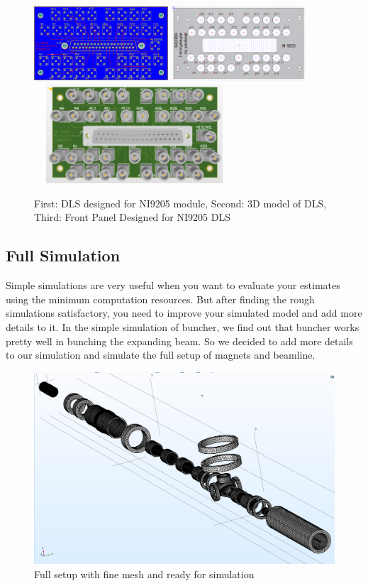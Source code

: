 \documentclass[12pt,a4paper]{article}
\begin{document}
\begin{figure}[h]
\centering
\includegraphics[width=50mm, height=28mm]{ni9205_pcb}
\includegraphics[width=50mm,
height=28mm]{ni9205panel}
\includegraphics[width=75mm,
height=37mm]{ni9205_3d}
\caption{First: DLS designed for NI9205 module, Second: 3D model of DLS, Third: Front Panel Designed for NI9205 DLS}
\label{NI}
\end{figure}


\subsection{Full Simulation}
\label{clus}
‌Simple simulations are very useful when you want to evaluate your estimates using the minimum computation resources. But after finding the rough simulations satisfactory, you need to improve your simulated model and add more details to it. In the simple simulation of buncher, we find out that buncher works pretty well in bunching the expanding beam. So we decided to add more details to our simulation and simulate the full setup of magnets and beamline.

\begin{figure}[h]
\centering
\includegraphics[scale=0.4]{full-mesh}
\caption{Full setup with fine mesh and ready for simulation}
\end{figure}
\end{document}
